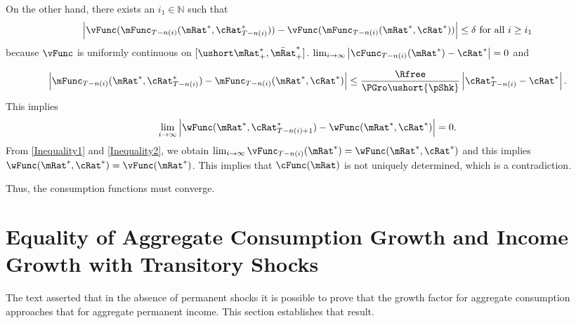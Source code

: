 \documentclass[titlepage]{\econtex}\providecommand{\texname}{BufferStockTheory}%
\begin{document}
On the other hand, there exists an $i_{1} \in \mathbb{N}$ such that
\begin{equation}
\left\vert \vFunc( \mFunc_{T-n( i) }( \mRat^{*},
\cRat^{*}_{T-n( i) }) ) -\vFunc( \mFunc
_{T-n( i) }( \mRat^{*},\cRat^{*}) )
\right\vert \leq \delta \text{ for all }i\geq i_{1}
\end{equation}
because $\vFunc$ is uniformly continuous on $[\ushort\mRat_{+}^{*},\bar\mRat_{+}^{*}]$. $\lim_{i\rightarrow \infty }\left\vert \cFunc_{T-n(i)}(\mRat^{*})-\cRat^{*}
\right\vert =0$ and

\begin{equation}
\left\vert \mFunc_{T-n( i) }( \mRat^{*},\cRat^{*}
_{T-n( i) }) -\mFunc_{T-n( i) }(
\mRat^{*},\cRat^{*}) \right\vert \leq \frac{\Rfree}{\PGro\ushort{\pShk}}
\left\vert \cRat^{*}_{T-n( i) }-\cRat^{*}\right\vert.
\end{equation}
This implies
\begin{equation}
\lim_{i\rightarrow \infty }\left\vert \wFunc(\mRat^{*},\cRat^{*}_{T-n(i)+1}) -\wFunc(\mRat^{*},\cRat^{*})
\right\vert =0  \label{Inequality2}.
\end{equation}
From \eqref{Inequality1} and \eqref{Inequality2}, we obtain $\lim_{i\rightarrow \infty }\vFunc_{T-n(i)}(\mRat^{*}
)=\wFunc( \mRat^{*},\cRat^{*}) $ and this implies $\wFunc(
\mRat^{*},\cRat^{*}) =\vFunc(\mRat^{*})$. This implies that $
\cFunc(\mRat)$ is not uniquely determined, which is a contradiction.

Thus, the consumption functions must converge.


\section{Equality of Aggregate Consumption Growth and Income Growth with Transitory Shocks}\label{sec:CGroEqPGro}

The text asserted that in the absence of permanent shocks it is possible to prove
that the growth factor for aggregate consumption approaches that for aggregate permanent
income.  This section establishes that result.
\end{document}
